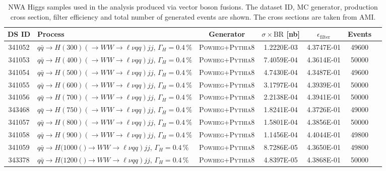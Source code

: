 \begin{landscape}
	\begin{table}[!htb]
		\caption{NWA Higgs samples used in the analysis produced via vector boson fusions. 
			The dataset ID, MC generator, production cross section, filter efficiency and total number of generated events are shown.
			The cross sections are taken from AMI.}
		\label{tabular:mc_samples_VBFH_NWA}
		\begin{footnotesize}
			\begin{center}
				\begin{tabular}{|c|l|c|c|c|c|r|}
					\hline
					DS ID & Process & Generator & $\sigma\times\text{BR}$ [nb] & $\epsilon_{\text{filter}}$ & Events \\ \hline
					341052 & $q\bar{q} \to H(300)\left( \to WW \to \ell\nu qq\right) jj$, $\Gamma_H=0.4\,\%$ & \textsc{Powheg}+\textsc{Pythia8} & 1.2220E-03 & 4.3747E-01 & 49600 \\
					341053 & $q\bar{q} \to H(400)\left( \to WW \to \ell\nu qq \right) jj$, $\Gamma_H=0.4\,\%$ & \textsc{Powheg}+\textsc{Pythia8} & 7.4059E-04 & 4.3614E-01 & 50000 \\
					341054 & $q\bar{q} \to H(500)\left( \to WW \to \ell\nu qq \right) jj$, $\Gamma_H=0.4\,\%$ & \textsc{Powheg}+\textsc{Pythia8} & 4.7430E-04 & 4.3487E-01 & 49600 \\
					341055 & $q\bar{q} \to H(600)\left( \to WW \to \ell\nu qq \right) jj$, $\Gamma_H=0.4\,\%$ & \textsc{Powheg}+\textsc{Pythia8} & 3.1797E-04 & 4.3939E-01 & 50000 \\
					341056 & $q\bar{q} \to H(700)\left( \to WW \to \ell\nu qq \right) jj$, $\Gamma_H=0.4\,\%$ & \textsc{Powheg}+\textsc{Pythia8} & 2.2138E-04 & 4.3941E-01 & 50000 \\
					343468 & $q\bar{q} \to H(750)\left( \to WW \to \ell\nu qq \right) jj$, $\Gamma_H=0.4\,\%$ & \textsc{Powheg}+\textsc{Pythia8} & 1.8241E-04 & 4.3726E-01 & 49000 \\
					341057 & $q\bar{q} \to H(800)\left( \to WW \to \ell\nu qq \right) jj$, $\Gamma_H=0.4\,\%$ & \textsc{Powheg}+\textsc{Pythia8} & 1.5801E-04 & 4.3856E-01 & 50000 \\
					341058 & $q\bar{q} \to H(900)\left( \to WW \to \ell\nu qq \right) jj$, $\Gamma_H=0.4\,\%$ & \textsc{Powheg}+\textsc{Pythia8} & 1.1456E-04 & 4.4044E-01 & 49800 \\
					341059 & $q\bar{q} \to H(1000\left() \to WW \to \ell\nu qq \right) jj$, $\Gamma_H=0.4\,\%$ & \textsc{Powheg}+\textsc{Pythia8} & 8.7286E-05 & 4.3650E-01 & 49800 \\
					343378 & $q\bar{q} \to H(1200\left() \to WW \to \ell\nu qq \right) jj$, $\Gamma_H=0.4\,\%$ & \textsc{Powheg}+\textsc{Pythia8} & 4.8397E-05 & 4.3868E-01 & 50000 \\

\end{tabular}
\end{center}
\end{footnotesize}
\end{table}
\end{landscape}
